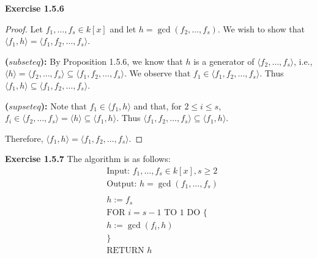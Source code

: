 \documentclass[12pt,oneside]{article}
\newenvironment{exercise}[1]{\vspace{.1in}\noindent\textbf{Exercise #1 \hspace{.05em}}}{}
\begin{document}
\begin{exercise}{1.5.6}
    \begin{proof}
        Let $f_1,\ldots,f_s \in k[x]$ and let $h=\gcd(f_2,\ldots,f_s)$. We 
        wish to show that $\langle f_1,h \rangle = \langle f_1,f_2,\ldots,f_s \rangle$.

        \bigskip
        \textbf{($subseteq$):} By Proposition 1.5.6, we know that $h$ is a generator of $\langle f_2,\ldots,f_s \rangle$, i.e.,
        $\langle h \rangle = \langle f_2,\ldots,f_s \rangle \subseteq \langle f_1,f_2,\ldots,f_s \rangle$.
        We observe that $f_1 \in \langle f_1,f_2,\ldots,f_s \rangle$. Thus 
        $\langle f_1, h \rangle \subseteq \langle f_1,f_2,\ldots,f_s \rangle$.

        \bigskip
        \textbf{($supseteq$):} Note that $f_1 \in \langle f_1,h \rangle$ and that,
        for $2 \leq i \leq s$, $f_i \in \langle f_2,\ldots,f_s \rangle = \langle h \rangle \subseteq \langle f_1, h \rangle$.
        Thus $\langle f_1,f_2,\ldots,f_s \rangle \subseteq \langle f_1,h \rangle$.

        Therefore, $\langle f_1,h \rangle = \langle f_1,f_2,\ldots,f_s \rangle$.
    \end{proof}
\end{exercise}


\begin{exercise}{1.5.7}
    The algorithm is as follows:
    \begin{align*}
        &\text{Input: }f_1,\ldots,f_s \in k[x], s\geq 2\\
        &\text{Output: }h = \gcd(f_1,\ldots,f_s)\\
        \\
        &h:=f_s\\
        &\text{FOR }i=s-1 \text{ TO } 1 \text{ DO \{}\\
        &h:=\gcd(f_i,h)\\
        &\}\\
        &\text{RETURN }h
    \end{align*}
\end{exercise}

\end{document}
